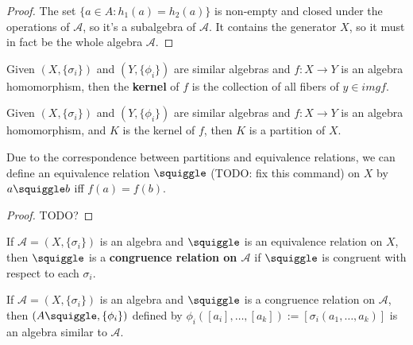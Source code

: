 \begin{proof}

The set $\{ a \in A : h_1(a) = h_2(a) \}$ is non-empty and closed under the operations of $\mathcal{A}$, so it's a subalgebra of $\mathcal{A}$. It contains the generator $X$, so it must in fact be the whole algebra $\mathcal{A}$.

\end{proof}


\begin{definition}
\label{def-algebra-homomorphism-kernel}

Given $(X, \{\sigma_i\})$ and $(Y, \{\phi_i\})$ are similar algebras and $f: X \rightarrow Y$ is an algebra homomorphism, then the \textbf{kernel} of $f$ is the collection of all fibers of $y \in img f$.

\end{definition}


\begin{lemma}
\label{lemma-kernel-of-homomorphism-is-partition}

Given $(X, \{\sigma_i\})$ and $(Y, \{\phi_i\})$ are similar algebras and $f: X \rightarrow Y$ is an algebra homomorphism, and $K$ is the kernel of $f$, then $K$ is a partition of $X$. 

Due to the correspondence between partitions and equivalence relations, we can define an equivalence relation $\squiggle$ (TODO: fix this command) on $X$ by $a \squiggle b$ iff $f(a) = f(b)$.

\end{lemma}

\begin{proof}
TODO?

\end{proof}


\begin{definition}
\label{def-congruence-relation}
If $\mathcal{A} = (X, \{\sigma_i\})$ is an algebra and $\squiggle$ is an equivalence relation on $X$, then $\squiggle$ is a \textbf{congruence relation on $\mathcal{A}$} if $\squiggle$ is congruent with respect to each $\sigma_i$.

\end{definition}

\begin{proposition}
\label{prop-congrel-induces-similar-algebra}

If $\mathcal{A} = (X, \{\sigma_i\})$ is an algebra and $\squiggle$ is a congruence relation on $\mathcal{A}$, then $(A \\ \squiggle, \{\phi_i\})$ defined by $\phi_i([a_i], \ldots, [a_k]) := [\sigma_i(a_1, \ldots, a_k)]$ is an algebra similar to $\mathcal{A}$.
\end{proposition}

